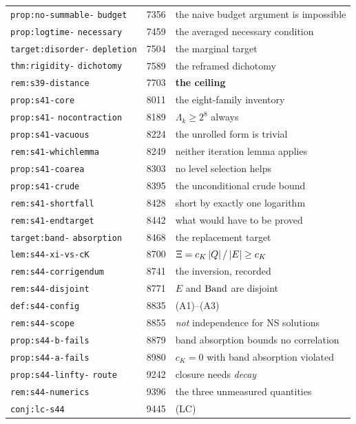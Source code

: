 {\begin{longtable}{@{}>{\raggedright\arraybackslash}p{} l >{\raggedright\arraybackslash}p{}@{}}
\texttt{prop:no-summable-} \texttt{budget} & 7356 & the naive budget argument
  is impossible \\
\texttt{prop:logtime-} \texttt{necessary} & 7459 & the averaged necessary
  condition \\
\texttt{target:disorder-} \texttt{depletion} & 7504 & the marginal target \\
\texttt{thm:rigidity-} \texttt{dichotomy} & 7589 & the reframed dichotomy \\
\texttt{rem:s39-distance} & 7703 & \textbf{the ceiling} \\
\texttt{prop:s41-core} & 8011 & the eight-family inventory \\
\texttt{prop:s41-} \texttt{nocontraction} & 8189 & \(\Lambda_k\ge2^8\) always \\
\texttt{prop:s41-vacuous} & 8224 & the unrolled form is trivial \\
\texttt{rem:s41-whichlemma} & 8249 & neither iteration lemma applies \\
\texttt{prop:s41-coarea} & 8303 & no level selection helps \\
\texttt{prop:s41-crude} & 8395 & the unconditional crude bound \\
\texttt{rem:s41-shortfall} & 8428 & short by exactly one logarithm \\
\texttt{rem:s41-endtarget} & 8442 & what would have to be proved \\
\texttt{target:band-} \texttt{absorption} & 8468 & the replacement target \\
\texttt{lem:s44-xi-vs-cK} & 8700 & \(\Xi=c_K\left|Q\right|/\left|E\right|\ge c_K\) \\
\texttt{rem:s44-corrigendum} & 8741 & the inversion, recorded \\
\texttt{rem:s44-disjoint} & 8771 & \(E\) and \(\mathrm{Band}\) are disjoint \\
\texttt{def:s44-config} & 8835 & (A1)--(A3) \\
\texttt{rem:s44-scope} & 8855 & \emph{not} independence for NS solutions \\
\texttt{prop:s44-b-fails} & 8879 & band absorption bounds no correlation \\
\texttt{prop:s44-a-fails} & 8980 & \(c_K=0\) with band absorption violated \\
\texttt{prop:s44-linfty-} \texttt{route} & 9242 & closure needs \emph{decay} \\
\texttt{rem:s44-numerics} & 9396 & the three unmeasured quantities \\
\texttt{conj:lc-s44} & 9445 & (LC) \\

\end{longtable}}
